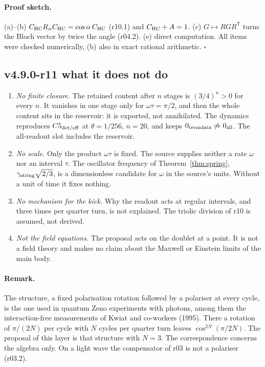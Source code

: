 \paragraph{Proof sketch.}
(a)--(b) \(C_{\mathrm{HC}}R_\alpha C_{\mathrm{HC}}=\cos\alpha\,C_{\mathrm{HC}}\) (r10.1) and \(C_{\mathrm{HC}}+A=1\).  (c) \(G\mapsto RGR^{\mathsf T}\) turns the
Bloch vector by twice the angle (r04.2).  (e) direct computation.  All items were checked numerically, (b) also in exact
rational arithmetic.  \(\square\)

\subsection*{v4.9.0-r11 what it does not do}
\label{subsec:v490-r11-limits}

\begin{enumerate}[leftmargin=2em]
\item \emph{No finite closure.}  The retained content after \(n\) stages is \((3/4)^n>0\) for every \(n\).  It vanishes in
one stage only for \(\omega\tau=\pi/2\), and then the whole content sits in the reservoir: it is exported, not annihilated.
The dynamics reproduces \(C5_{\rm det/eff}\) at \(\theta=1/256\), \(n=20\), and keeps
\(0_{\rm termdata}\not\Rightarrow0_{\rm all}\).  The all-readout slot includes the reservoir.
\item \emph{No scale.}  Only the product \(\omega\tau\) is fixed.  The source supplies neither a rate \(\omega\) nor an interval
\(\tau\).  The oscillator frequency of Theorem~\ref{thm:spring}, \(\gamma_{\mathrm{string}}\sqrt{2/3}\), is a dimensionless candidate for
\(\omega\) in the source's units.  Without a unit of time it fixes nothing.
\item \emph{No mechanism for the kick.}  Why the readout acts at regular intervals, and three times per quarter turn, is
not explained.  The triolic division of r10 is assumed, not derived.
\item \emph{Not the field equations.}  The proposal acts on the doublet at a point.  It is not a field theory and makes no
claim about the Maxwell or Einstein limits of the main body.
\end{enumerate}

\paragraph{Remark.}
The structure, a fixed polarisation rotation followed by a polariser at every cycle, is the one used in quantum Zeno
experiments with photons, among them the interaction-free measurements of Kwiat and co-workers (1995).  There a rotation of
\(\pi/(2N)\) per cycle with \(N\) cycles per quarter turn leaves \(\cos^{2N}(\pi/2N)\).  The proposal of this layer is that
structure with \(N=3\).  The correspondence concerns the algebra only.  On a light wave the compensator of r03 is not a
polariser (r03.2).


